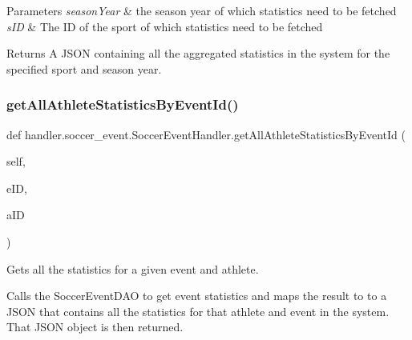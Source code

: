 \begin{DoxyParams}{Parameters}
{\em season\+Year} & the season year of which statistics need to be fetched \\
\hline
{\em s\+ID} & The ID of the sport of which statistics need to be fetched\\
\hline
\end{DoxyParams}
\begin{DoxyReturn}{Returns}
A J\+S\+ON containing all the aggregated statistics in the system for the specified sport and season year. 
\end{DoxyReturn}
\mbox{\label{classhandler_1_1soccer__event_1_1_soccer_event_handler_aae926243409f46541c7d156081319527}} 
\subsubsection{\texorpdfstring{get\+All\+Athlete\+Statistics\+By\+Event\+Id()}{getAllAthleteStatisticsByEventId()}}
{\footnotesize\ttfamily def handler.\+soccer\+\_\+event.\+Soccer\+Event\+Handler.\+get\+All\+Athlete\+Statistics\+By\+Event\+Id (\begin{DoxyParamCaption}\item[{}]{self,  }\item[{}]{e\+ID,  }\item[{}]{a\+ID }\end{DoxyParamCaption})}



Gets all the statistics for a given event and athlete. 

Calls the Soccer\+Event\+D\+AO to get event statistics and maps the result to to a J\+S\+ON that contains all the statistics for that athlete and event in the system. That J\+S\+ON object is then returned.


